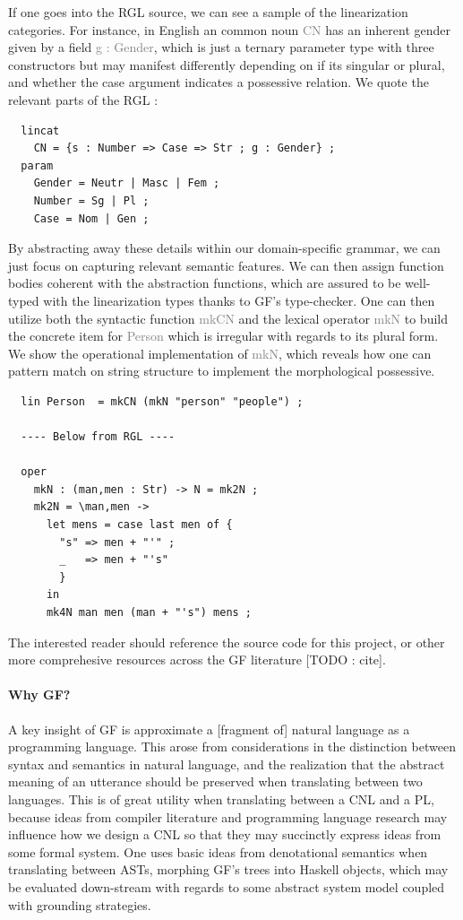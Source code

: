 \documentclass{article}
\newcommand{\gray}[1]{\textcolor{gray}{#1}}
\begin{document}
If one goes into the RGL source, we can see a sample of the linearization
categories. For instance, in English an common noun \gray{CN} has an inherent
gender given by a field \gray{g : Gender}, which is just a ternary parameter
type with three constructors but may manifest differently
depending on if its singular or plural, and whether the case argument indicates
a possessive relation. We quote the relevant parts of the RGL :

\begin{verbatim}
  lincat
    CN = {s : Number => Case => Str ; g : Gender} ;
  param
    Gender = Neutr | Masc | Fem ;
    Number = Sg | Pl ;
    Case = Nom | Gen ;
\end{verbatim}

By abstracting away these details within our domain-specific grammar, we can
just focus on capturing relevant semantic features. We can then assign function
bodies coherent with the abstraction functions, which are assured to be
well-typed with the linearization types thanks to GF's type-checker. One can
then utilize both the syntactic function \gray{mkCN} and the lexical operator
\gray{mkN} to build the concrete item for \gray{Person} which is irregular with regards
to its plural form. We show the operational implementation of \gray{mkN}, which
reveals how one can pattern match on string structure to implement the
morphological possessive.

\begin{verbatim}
  lin Person  = mkCN (mkN "person" "people") ;

  ---- Below from RGL ----

  oper
    mkN : (man,men : Str) -> N = mk2N ;
    mk2N = \man,men ->
      let mens = case last men of {
        "s" => men + "'" ;
        _   => men + "'s"
        }
      in
      mk4N man men (man + "'s") mens ;
\end{verbatim}

The interested reader should reference the source code for this project, or
other more comprehesive resources across the GF literature [TODO : cite].

\paragraph{Why GF?}

A key insight of GF is approximate a [fragment of] natural language as a
programming language. This arose from considerations in the distinction between
syntax and semantics in natural language, and the realization that the abstract
meaning of an utterance should be preserved when translating between two
languages. This is of great utility when translating between a CNL and a PL,
because ideas from compiler literature and programming language research may
influence how we design a CNL so that they may succinctly express ideas from
some formal system. One uses basic ideas from denotational semantics when
translating between ASTs, morphing GF's trees into Haskell objects, which may be
evaluated down-stream with regards to some abstract system model coupled with
grounding strategies.
\end{document}

